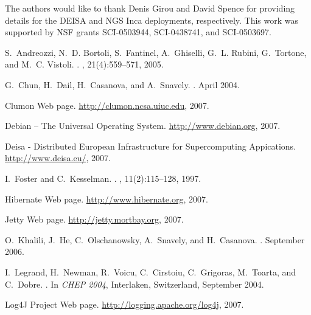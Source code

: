 \documentclass{sig-alternate}
\begin{document}
The authors would like to thank Denis Girou and David Spence for providing
details for the DEISA and NGS Inca deployments, respectively.  This work was
supported by NSF grants SCI-0503944, SCI-0438741, and SCI-0503697.



\begin{thebibliography}{10}

S.~Andreozzi, N.~D. Bortoli, S.~Fantinel, A.~Ghiselli, G.~L. Rubini,
  G.~Tortone, and M.~C. Vistoli.
.
, 21(4):559--571, 2005.

G.~Chun, H.~Dail, H.~Casanova, and A.~Snavely.
.
\newblock April 2004.

{Clumon Web page}.
\newblock \url{http://clumon.ncsa.uiuc.edu}, 2007.

{Debian -- The Universal Operating System}.
\newblock \url{http://www.debian.org}, 2007.

{Deisa - Distributed European Infrastructure for Supercomputing Appications}.
\newblock \url{http://www.deisa.eu/}, 2007.

I.~Foster and C.~Kesselman.
.
,
  11(2):115--128, 1997.

{Hibernate Web page}.
\newblock \url{http://www.hibernate.org}, 2007.

{Jetty Web page}.
\newblock \url{http://jetty.mortbay.org}, 2007.

O.~Khalili, J.~He, C.~Olschanowsky, A.~Snavely, and H.~Casanova.
.
\newblock September 2006.

I.~Legrand, H.~Newman, R.~Voicu, C.~Cirstoiu, C.~Grigoras, M.~Toarta, and
  C.~Dobre.
.
\newblock In {\em CHEP 2004}, Interlaken, Switzerland, September 2004.

{Log4J Project Web page}.
\newblock \url{http://logging.apache.org/log4j}, 2007.


\end{thebibliography}
\end{document}
